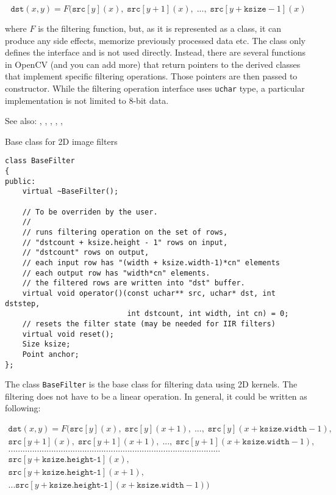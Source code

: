 \[\texttt{dst}(x,y) = F(\texttt{src}[y](x),\;\texttt{src}[y+1](x),\;...,\;\texttt{src}[y+\texttt{ksize}-1](x)\]

where $F$ is the filtering function, but, as it is represented as a class, it can produce any side effects, memorize previously processed data etc. The class only defines the interface and is not used directly. Instead, there are several functions in OpenCV (and you can add more) that return pointers to the derived classes that implement specific filtering operations. Those pointers are then passed to  constructor. While the filtering operation interface uses \texttt{uchar} type, a particular implementation is not limited to 8-bit data.

See also: , , ,
    , , 


Base class for 2D image filters

\begin{lstlisting}
class BaseFilter
{
public:
    virtual ~BaseFilter();
    
    // To be overriden by the user.
    //
    // runs filtering operation on the set of rows,
    // "dstcount + ksize.height - 1" rows on input,
    // "dstcount" rows on output,
    // each input row has "(width + ksize.width-1)*cn" elements
    // each output row has "width*cn" elements.
    // the filtered rows are written into "dst" buffer.
    virtual void operator()(const uchar** src, uchar* dst, int dststep,
                            int dstcount, int width, int cn) = 0;
    // resets the filter state (may be needed for IIR filters)                        
    virtual void reset();
    Size ksize;
    Point anchor;
};
\end{lstlisting}

The class \texttt{BaseFilter} is the base class for filtering data using 2D kernels. The filtering does not have to be a linear operation. In general, it could be written as following:

\[
  \begin{array}{l}
  \texttt{dst}(x,y) = F( \texttt{src}[y](x),\;\texttt{src}[y](x+1),\;...,\;\texttt{src}[y](x+\texttt{ksize.width}-1), \\
  \texttt{src}[y+1](x),\;\texttt{src}[y+1](x+1),\;...,\;\texttt{src}[y+1](x+\texttt{ksize.width}-1), \\
  ......................................................................................... \\
  \texttt{src}[y+\texttt{ksize.height-1}](x),\\
  \texttt{src}[y+\texttt{ksize.height-1}](x+1),\\
  ...
  \texttt{src}[y+\texttt{ksize.height-1}](x+\texttt{ksize.width}-1))
  \end{array}
  \]

